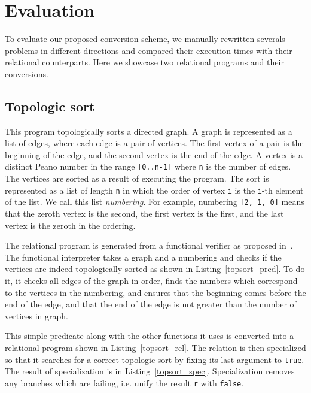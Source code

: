 \section{Evaluation}

To evaluate our proposed conversion scheme, we manually rewritten severals problems in different directions and compared their execution times with their relational counterparts.
Here we showcase two relational programs and their conversions.





\subsection{Topologic sort}

This program topologically sorts a directed graph.
A graph is represented as a list of edges, where each edge is a pair of vertices.
The first vertex of a pair is the beginning of the edge, and the second vertex is the end of the edge.
A vertex is a distinct Peano number in the range \lstinline{[0..n-1]} where \lstinline{n} is the number of edges.
The vertices are sorted as a result of executing the program.
The sort is represented as a list of length \lstinline{n} in which the order of vertex \lstinline{i} is the \lstinline{i}-th element of the list.
We call this list \emph{numbering}.
For example, numbering \lstinline{[2, 1, 0]} means that the zeroth vertex is the second, the first vertex is the first, and the last vertex is the zeroth in the ordering.

The relational program is generated from a functional verifier as proposed in~\cite{lozov2019relational}.
The functional interpreter takes a graph and a numbering and checks if the vertices are indeed topologically sorted as shown in Listing~\ref{topsort_pred}.
To do it, it checks all edges of the graph in order, finds the numbers which correspond to the vertices in the numbering, and ensures that the beginning comes before the end of the edge, and that the end of the edge is not greater than the number of vertices in graph.

This simple predicate along with the other functions it uses is converted into a relational program shown in Listing~\ref{topsort_rel}.
The relation is then specialized so that it searches for a correct topologic sort by fixing its last argument to \lstinline{true}.
The result of specialization is in Listing~\ref{topsort_spec}.
Specialization removes any \conde branches which are failing, i.e. unify the result \lstinline{r} with \lstinline{false}.

